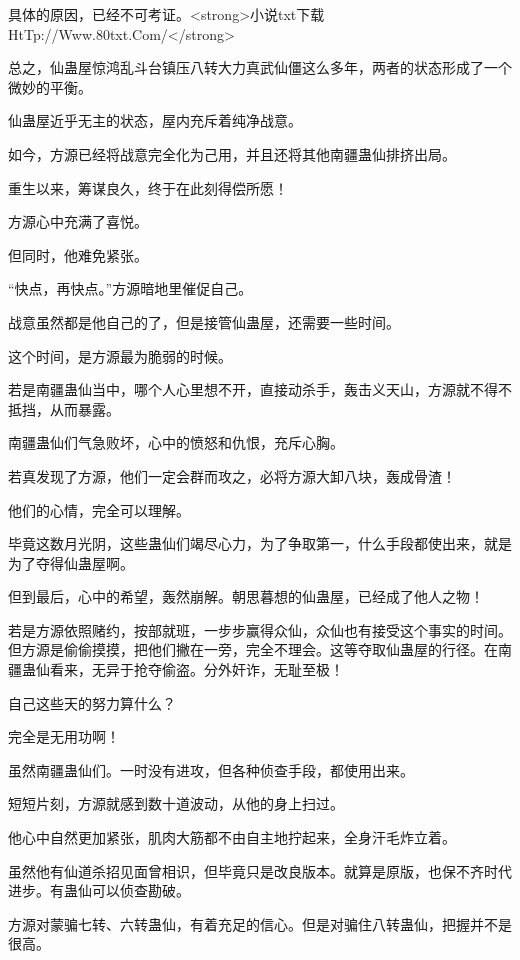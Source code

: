 
\begin{this_body}

具体的原因，已经不可考证。<strong>小说txt下载HtTp://Www.80txt.Com/</strong>

总之，仙蛊屋惊鸿乱斗台镇压八转大力真武仙僵这么多年，两者的状态形成了一个微妙的平衡。

仙蛊屋近乎无主的状态，屋内充斥着纯净战意。

如今，方源已经将战意完全化为己用，并且还将其他南疆蛊仙排挤出局。

重生以来，筹谋良久，终于在此刻得偿所愿！

方源心中充满了喜悦。

但同时，他难免紧张。

“快点，再快点。”方源暗地里催促自己。

战意虽然都是他自己的了，但是接管仙蛊屋，还需要一些时间。

这个时间，是方源最为脆弱的时候。

若是南疆蛊仙当中，哪个人心里想不开，直接动杀手，轰击义天山，方源就不得不抵挡，从而暴露。

南疆蛊仙们气急败坏，心中的愤怒和仇恨，充斥心胸。

若真发现了方源，他们一定会群而攻之，必将方源大卸八块，轰成骨渣！

他们的心情，完全可以理解。

毕竟这数月光阴，这些蛊仙们竭尽心力，为了争取第一，什么手段都使出来，就是为了夺得仙蛊屋啊。

但到最后，心中的希望，轰然崩解。朝思暮想的仙蛊屋，已经成了他人之物！

若是方源依照赌约，按部就班，一步步赢得众仙，众仙也有接受这个事实的时间。但方源是偷偷摸摸，把他们撇在一旁，完全不理会。这等夺取仙蛊屋的行径。在南疆蛊仙看来，无异于抢夺偷盗。分外奸诈，无耻至极！

自己这些天的努力算什么？

完全是无用功啊！

虽然南疆蛊仙们。一时没有进攻，但各种侦查手段，都使用出来。

短短片刻，方源就感到数十道波动，从他的身上扫过。

他心中自然更加紧张，肌肉大筋都不由自主地拧起来，全身汗毛炸立着。

虽然他有仙道杀招见面曾相识，但毕竟只是改良版本。就算是原版，也保不齐时代进步。有蛊仙可以侦查勘破。

方源对蒙骗七转、六转蛊仙，有着充足的信心。但是对骗住八转蛊仙，把握并不是很高。


\end{this_body}
